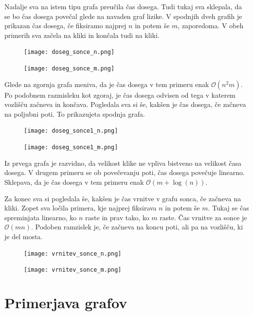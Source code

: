 \documentclass[12pt,a4paper]{amsart}
\begin{document}
Nadalje sva na istem tipu grafa preučila čas dosega. Tudi tukaj sva sklepala, da se bo čas dosega povečal glede na navaden graf lizike.
V spodnjih dveh grafih je prikazan čas dosega, če fiksiramo najprej $n$ in potem še $m$, zaporedoma. V obeh primerih sva začela na kliki
in končala tudi na kliki.


\begin{figure}[!tbp]
    \centering
    \begin{minipage}[b]{0.6\textwidth}
      \texttt{[image: doseg\_sonce\_n.png]}
    \end{minipage}
    \hfill
    \begin{minipage}[b]{0.6\textwidth}
      \texttt{[image: doseg\_sonce\_m.png]}
    \end{minipage}
  \end{figure}

Glede na zgornja grafa meniva, da je čas dosega v tem primeru enak $\mathcal{O}(n^2m)$. Po podobnem 
razmisleku kot zgoraj, je čas dosega odvisen od tega v katerem vozlišču začneva in končava. Pogledala sva si še, 
kakšen je čas dosega, če začneva na poljubni poti. To prikazujeta spodnja grafa.

\begin{figure}[!tbp]
    \centering
    \begin{minipage}[b]{0.6\textwidth}
      \texttt{[image: doseg\_sonce1\_n.png]}
    \end{minipage}
    \hfill
    \begin{minipage}[b]{0.6\textwidth}
      \texttt{[image: doseg\_sonce1\_m.png]}
    \end{minipage}
  \end{figure}

  Iz prvega grafa je razvidno, da velikost klike ne vpliva bistveno na velikost časa dosega. 
  V drugem primeru se ob povečevanju poti, čas dosega 
  povečuje linearno. Sklepava, da je čas dosega v tem primeru enak $\mathcal{O}(m+\log(n))$.

  Za konec sva si pogledala še, kakšen je čas vrnitve v grafu sonca, če začneva na kliki. Zopet sva ločila primera, kje najprej fiksirava $n$ in potem
  še $m$. Tukaj se čas spreminjata linearno, ko $n$ raste in prav tako, ko $m$ raste. Čas vrnitve za sonce je $\mathcal{O}(mn)$.
  Podoben ramzislek je, če začneva na koncu poti, ali pa na vozlišču, ki je del mosta.

  \begin{figure}[!tbp]
    \centering
    \begin{minipage}[b]{0.6\textwidth}
      \texttt{[image: vrnitev\_sonce\_n.png]}
    \end{minipage}
    \hfill
    \begin{minipage}[b]{0.6\textwidth}
      \texttt{[image: vrnitev\_sonce\_m.png]}
    \end{minipage}
  \end{figure}

  \section{Primerjava grafov}
\end{document}
